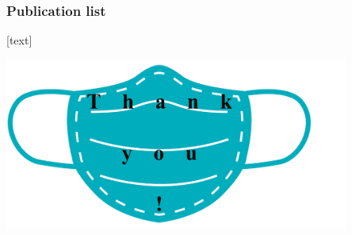 \documentclass[9pt]{beamer}
\begin{document}
\begin{frame}
\frametitle{Publication list}
\scriptsize	

[text]

\end{frame}


\begin{frame}
\begin{center}
\includegraphics[width=0.85\textwidth]{./fig/thankyou.pdf}
\end{center}
\end{frame}


\begin{frame}[plain]
\begin{center}

\end{center}
\end{frame}
\end{document}
